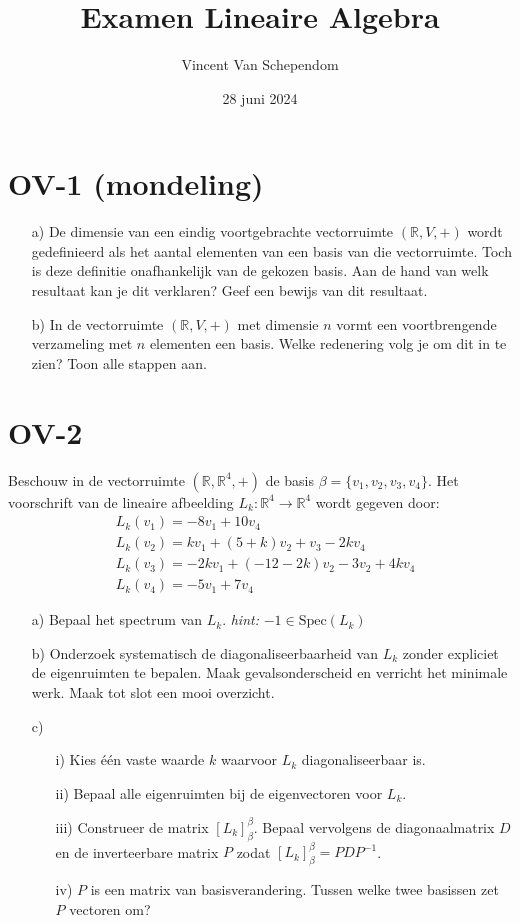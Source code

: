 \documentclass[kulak]{kulakarticle} %
\title{Examen Lineaire Algebra}
\author{Vincent Van Schependom}
\date{28 juni 2024}
\newcommand{\R}{\mathbb{R}} %
\begin{document}
\maketitle

\section*{OV-1 (mondeling)}

\begin{itemize}
	\item[a)] De dimensie van een eindig voortgebrachte vectorruimte \((\R, V, +)\) wordt gedefinieerd als het aantal elementen van een basis van die vectorruimte. Toch is deze definitie onafhankelijk van de gekozen basis. Aan de hand van welk resultaat kan je dit verklaren? Geef een bewijs van dit resultaat.
	\item[b)] In de vectorruimte \((\R, V, +)\) met dimensie \(n\) vormt een voortbrengende verzameling met \(n\) elementen een basis. Welke redenering volg je om dit in te zien? Toon alle stappen aan.
\end{itemize}

\section*{OV-2}

Beschouw in de vectorruimte \((\R, \R^4, +)\) de basis \(\beta=\{v_1,v_2,v_3,v_4\}\). Het voorschrift van de lineaire afbeelding \(L_k:\R^4\to\R^4\) wordt gegeven door:
\begin{align*}
&L_k(v_1) = -8v_1 + 10v_4 \\
&L_k(v_2) = kv_1 + (5+k)v_2 + v_3 - 2kv_4 \\
&L_k(v_3) = -2kv_1+(-12-2k)v_2-3v_2+4kv_4 \\
&L_k(v_4) = -5v_1+7v_4
\end{align*}

\begin{itemize}
	\item[a)] Bepaal het spectrum van \(L_k\). \hspace{1cm} \textit{hint:} \(-1 \in \text{Spec}(L_k)\)
	\item[b)] Onderzoek systematisch de diagonaliseerbaarheid van \(L_k\) zonder expliciet de eigenruimten te bepalen. Maak gevalsonderscheid en verricht het minimale werk. Maak tot slot een mooi overzicht.
	\item[c)] \begin{itemize}
		\item[i)] Kies één vaste waarde \(k\) waarvoor \(L_k\) diagonaliseerbaar is.
		\item[ii)] Bepaal alle eigenruimten bij de eigenvectoren voor \(L_k\).
		\item[iii)] Construeer de matrix \([L_k]_{\beta}^{\beta}\). Bepaal vervolgens de diagonaalmatrix \(D\) en de inverteerbare matrix \(P\) zodat \([L_k]_{\beta}^{\beta}=PDP^{-1}\).
		\item[iv)] \(P\) is een matrix van basisverandering. Tussen welke twee basissen zet \(P\) vectoren om?
	\end{itemize}
\end{itemize}
\end{document}
